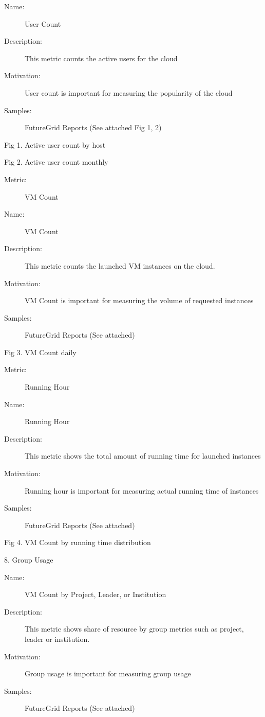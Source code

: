\documentclass{sig-alternate}
\begin{document}
\begin{description}
\item[Name:] User Count
\item[Description:] This metric counts the active users for the cloud
\item[Motivation:] User count is important for measuring the popularity of the cloud
\item[Samples:] FutureGrid Reports (See attached Fig 1, 2)
\end{description}
  
Fig 1. Active user count by host                  

Fig 2. Active user count monthly
\begin{description}
\item[Metric:] VM Count
\item[Name:] VM Count
\item[Description:] This metric counts the launched VM instances on the cloud.
\item[Motivation:] VM Count is important for measuring the volume of requested instances
\item[Samples:] FutureGrid Reports (See attached)
\end{description}
 
Fig 3. VM Count daily
\begin{description}
\item[Metric:] Running Hour
\item[Name:] Running Hour
\item[Description:] This metric shows the total amount of running time for launched instances
\item[Motivation:] Running hour is important for measuring actual running time of instances
\item[Samples:] FutureGrid Reports (See attached)
\end{description}

 
Fig 4. VM Count by running time distribution

8.      Group Usage
\begin{description}
\item[Name:] VM Count by Project, Leader, or Institution
\item[Description:] This metric shows share of resource by group metrics such as project, leader or institution.
\item[Motivation:] Group usage is important for measuring group usage
\item[Samples:] FutureGrid Reports (See attached)
\end{description}
\end{document}
